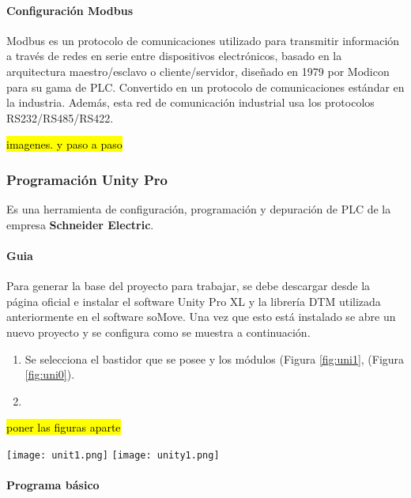 \paragraph{Configuración Modbus}
\begin{tcolorbox}[colback=blue!5!white,colframe=blue!75!black,title=ModBus]
	Modbus es un protocolo de comunicaciones utilizado para transmitir información a través de redes en serie entre dispositivos electrónicos, basado en la arquitectura maestro/esclavo o cliente/servidor, diseñado en 1979 por Modicon para su gama de PLC. Convertido en un protocolo de comunicaciones estándar en la industria. Además, esta red de comunicación industrial usa los protocolos RS232/RS485/RS422.
\end{tcolorbox}
\hl{imagenes. y paso a paso}

\subsubsection{Programación Unity Pro}
\begin{tcolorbox}[colback=blue!5!white,colframe=blue!75!black,title=Definición]
	Es una herramienta de configuración, programación y depuración de PLC de la empresa \textbf{Schneider Electric}.
\end{tcolorbox}

\paragraph{Guia}
Para generar la base del proyecto para trabajar, se debe descargar desde la página oficial e instalar el software Unity Pro XL y la librería DTM utilizada anteriormente en el software soMove. Una vez que esto está instalado se abre un nuevo proyecto y se configura como se muestra a continuación.
\begin{enumerate}
	\item Se selecciona el bastidor que se posee y los módulos (Figura \ref{fig:uni1}, (Figura \ref{fig:uni0}).
	
	\item 
  \end{enumerate}
\hl{poner las figuras aparte}
	\begin{center}
		\texttt{[image: unit1.png]}
	\label{fig:uni1}
		\texttt{[image: unity1.png]}
	\label{fig:uni0}
	\end{center}
	
	


\paragraph{Programa básico}
\newpage


